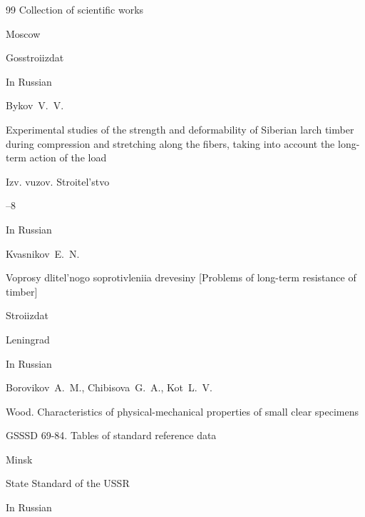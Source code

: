 \begin{thebibliography}{99}
\bookinfo Collection of scientific works

\publaddr Moscow

\publ Gosstroiizdat






\lang In Russian

\by Bykov~V.~V.

\paper Experimental studies of the strength and deformability of Siberian larch timber during compression and stretching along the fibers, taking into account the long-term action of the load

\jour Izv. vuzov. Stroitel'stvo



--8






\lang In Russian

\by Kvasnikov~E.~N.

\book Voprosy dlitel'nogo soprotivleniia drevesiny \rm [Problems of long-term resistance of timber]


\publ Stroiizdat

\publaddr Leningrad









\lang In Russian

\by Borovikov~A.~M., Chibisova~G.~A., Kot~L.~V.

\book Wood. Characteristics of physical-mechanical properties of small clear specimens

\bookinfo GSSSD 69-84. Tables of standard reference data


\publaddr Minsk

\publ State Standard of the USSR







\lang In Russian


\end{thebibliography}
